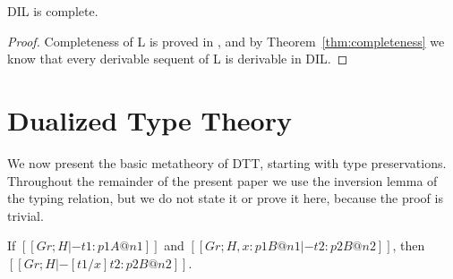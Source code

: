 \begin{corollary}[Completeness]
  \label{corollary:completeness}
  DIL is complete.
\end{corollary}
\begin{proof}
  Completeness of L is proved in \cite{Pinto:2009}, and by Theorem~\ref{thm:completeness} we know that
  every derivable sequent of L is derivable in DIL.
\end{proof}

\section{Dualized Type Theory}
\label{sec:dualized_type_theory}
We now present the basic metatheory of DTT, starting with type
preservations. Throughout the remainder of the present paper we use
the inversion lemma of the typing relation, but we do not state it or
prove it here, because the proof is trivial.
\begin{lemma}
  \label{lemma:substitution_for_typing}
  If $[[Gr ; H |- t1 : p1 A @ n1]]$ and $[[Gr ; H, x : p1 B @ n1 |- t2 : p2 B @ n2]]$, then
  $[[Gr ; H |- [t1/x]t2 : p2 B @ n2]]$.
\end{lemma}
